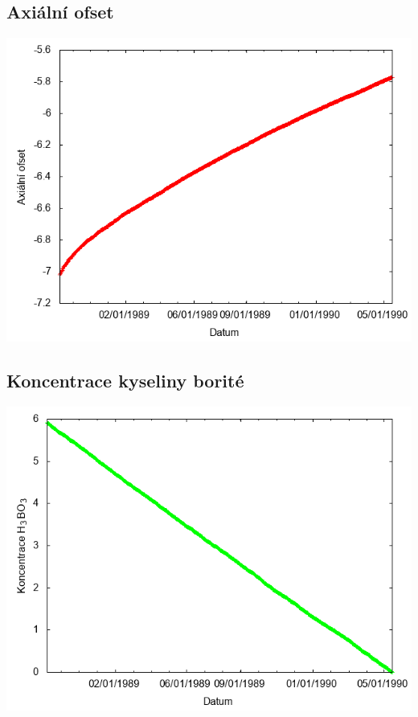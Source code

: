 \documentclass[a4paper,twoside,11pt]{article}
\begin{document}
\subsection*{Axiální ofset}
\begin{center}
\includegraphics[width=.8\textwidth]{graphs/Disneyland_03_ao.png}
\end{center}

\subsection*{Koncentrace kyseliny borité}
\begin{center}
\includegraphics[width=.8\textwidth]{graphs/Disneyland_03_bc.png}
\end{center}
\end{document}
